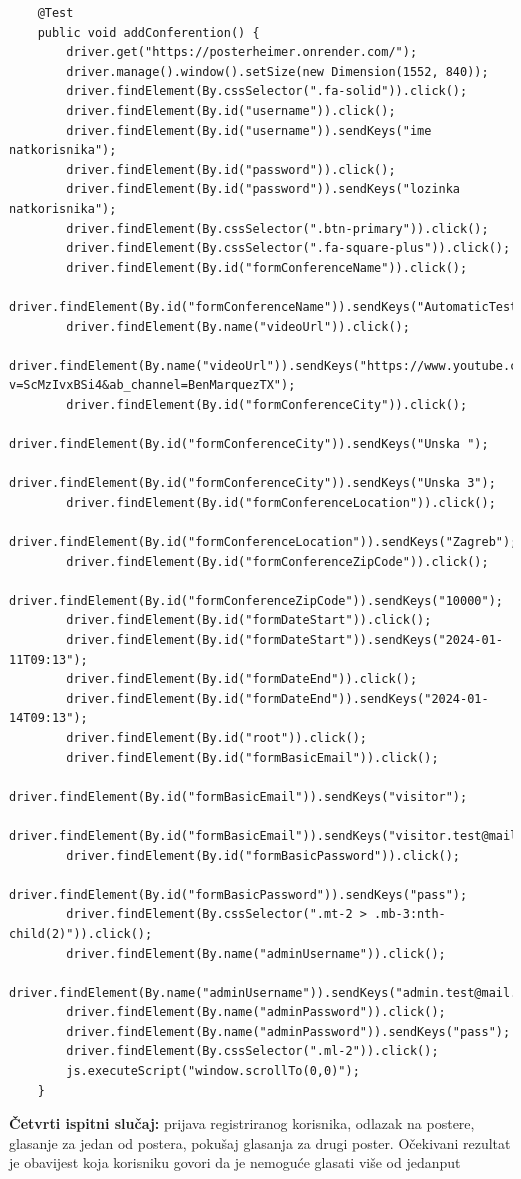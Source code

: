\begin{lstlisting}
	@Test
	public void addConferention() {
		driver.get("https://posterheimer.onrender.com/");
		driver.manage().window().setSize(new Dimension(1552, 840));
		driver.findElement(By.cssSelector(".fa-solid")).click();
		driver.findElement(By.id("username")).click();
		driver.findElement(By.id("username")).sendKeys("ime natkorisnika");
		driver.findElement(By.id("password")).click();
		driver.findElement(By.id("password")).sendKeys("lozinka natkorisnika");
		driver.findElement(By.cssSelector(".btn-primary")).click();
		driver.findElement(By.cssSelector(".fa-square-plus")).click();
		driver.findElement(By.id("formConferenceName")).click();
		driver.findElement(By.id("formConferenceName")).sendKeys("AutomaticTestKonferencija");
		driver.findElement(By.name("videoUrl")).click();
		driver.findElement(By.name("videoUrl")).sendKeys("https://www.youtube.com/watch?v=ScMzIvxBSi4&ab_channel=BenMarquezTX");
		driver.findElement(By.id("formConferenceCity")).click();
		driver.findElement(By.id("formConferenceCity")).sendKeys("Unska ");
		driver.findElement(By.id("formConferenceCity")).sendKeys("Unska 3");
		driver.findElement(By.id("formConferenceLocation")).click();
		driver.findElement(By.id("formConferenceLocation")).sendKeys("Zagreb");
		driver.findElement(By.id("formConferenceZipCode")).click();
		driver.findElement(By.id("formConferenceZipCode")).sendKeys("10000");
		driver.findElement(By.id("formDateStart")).click();
		driver.findElement(By.id("formDateStart")).sendKeys("2024-01-11T09:13");
		driver.findElement(By.id("formDateEnd")).click();
		driver.findElement(By.id("formDateEnd")).sendKeys("2024-01-14T09:13");
		driver.findElement(By.id("root")).click();
		driver.findElement(By.id("formBasicEmail")).click();
		driver.findElement(By.id("formBasicEmail")).sendKeys("visitor");
		driver.findElement(By.id("formBasicEmail")).sendKeys("visitor.test@mail.hr");
		driver.findElement(By.id("formBasicPassword")).click();
		driver.findElement(By.id("formBasicPassword")).sendKeys("pass");
		driver.findElement(By.cssSelector(".mt-2 > .mb-3:nth-child(2)")).click();
		driver.findElement(By.name("adminUsername")).click();
		driver.findElement(By.name("adminUsername")).sendKeys("admin.test@mail.hr");
		driver.findElement(By.name("adminPassword")).click();
		driver.findElement(By.name("adminPassword")).sendKeys("pass");
		driver.findElement(By.cssSelector(".ml-2")).click();
		js.executeScript("window.scrollTo(0,0)");
	}
\end{lstlisting}
		 	
		 	
		\textbf{Četvrti ispitni slučaj:} prijava registriranog korisnika, odlazak na postere, glasanje za jedan od postera, pokušaj glasanja za drugi poster. Očekivani rezultat je obavijest koja korisniku govori da je nemoguće glasati više od jedanput
			
